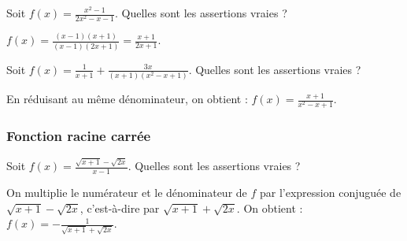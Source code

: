 \begin{question} 

Soit $f(x)= \frac{x^2-1}{2x^2-x-1}$. Quelles sont les assertions vraies ?
\begin{answers}



\end{answers}
\begin{explanations}
$f(x)=\frac{(x-1)(x+1)}{(x-1)(2x+1)}= \frac{x+1}{2x+1}$.
\end{explanations}

\end{question}


\begin{question} 

Soit $f(x)= \frac{1}{x+1}+ \frac{3x}{(x+1)(x^2-x+1)}$. Quelles sont les assertions vraies ?
\begin{answers}
    


\end{answers}
\begin{explanations}
En réduisant au même dénominateur, on obtient :  $f(x)= \frac{x+1}{x^2-x+1}$. 
\end{explanations}

\end{question}

\subsubsection{Fonction racine carrée}

\begin{question} 

Soit $f(x)= \frac{\sqrt {x+1}-\sqrt {2x}}{x-1}$. Quelles sont les assertions vraies ?
\begin{answers}
    


\end{answers}
\begin{explanations}
On multiplie le numérateur et le dénominateur de $f$ par l'expression conjuguée de $\sqrt {x+1}-\sqrt {2x}$, c'est-à-dire par  $\sqrt {x+1}+\sqrt {2x}$. On obtient : 
$f(x)= -\frac{1}{\sqrt {x+1}+\sqrt {2x}}$.
\end{explanations}

\end{question}


